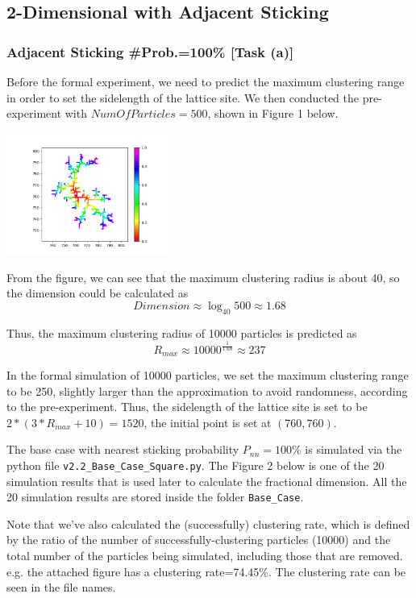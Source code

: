 \documentclass[10pt]{article}
\begin{document}
\subsection{2-Dimensional with Adjacent Sticking}

\subsubsection{Adjacent Sticking \#Prob.=100\% [Task (a)]}

Before the formal experiment, we need to predict the maximum clustering range in order to set the sidelength of the lattice site. We then conducted the pre-experiment with $NumOfParticles=500$, shown in Figure 1 below.

\begin{center}
	\includegraphics[width=0.4\textwidth]{Figure_1}
\end{center}

From the figure, we can see that the maximum clustering radius is about 40, so the dimension could be calculated as
$$
Dimension \approx \log_{40}{500} \approx 1.68
$$

Thus, the maximum clustering radius of 10000 particles is predicted as
$$
R_{max} \approx 10000^{\frac{1}{1.68}} \approx 237
$$

In the formal simulation of 10000 particles, we set the maximum clustering range to be 250, slightly larger than the approximation to avoid randomness, according to the pre-experiment. Thus, the sidelength of the lattice site is set to be $2*(3*R_{max}+10)=1520$, the initial point is set at $(760,760)$.

The base case with nearest sticking probability $P_{nn}=100\%$ is simulated via the python file \texttt{v2.2\_Base\_Case\_Square.py}. The Figure 2 below is one of the 20 simulation results that is used later to calculate the fractional dimension. All the 20 simulation results are stored inside the folder \texttt{Base\_Case}.

Note that we've also calculated the (successfully) clustering rate, which is defined by the ratio of the number of successfully-clustering particles (10000) and the total number of the particles being simulated, including those that are removed. e.g. the attached figure has a clustering rate=74.45\%. The clustering rate can be seen in the file names.
\end{document}
